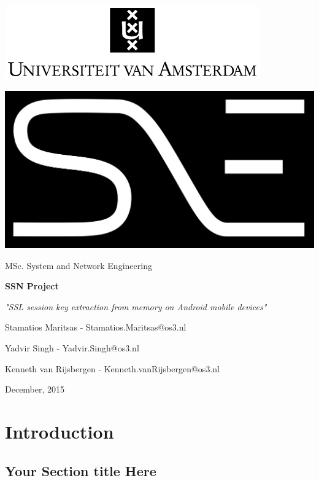 \documentclass[12pt, a4paper]{report}
\begin{document}
\begin{center}
\includegraphics[scale=0.6]{images/logo-uva.png}
\vspace{30pt}

\includegraphics[scale=0.2]{images/logo-sne_black-inv-flat}
\vspace{10pt}

\Large MSc. System and Network Engineering
\vspace{100pt}

\textbf{\huge SSN Project}
\vspace{10pt}

\textit{\Large "SSL session key extraction from memory on Android mobile devices"}
\vspace{80pt}

\large Stamatios Maritsas - Stamatios.Maritsas@os3.nl

\large Yadvir Singh - Yadvir.Singh@os3.nl

\large Kenneth van Rijsbergen - Kenneth.vanRijsbergen@os3.nl
\vspace{80pt}

\normalsize December, 2015
\end{center}


\tableofcontents

\chapter{Introduction}
\section{Your Section title Here}
\end{document}
